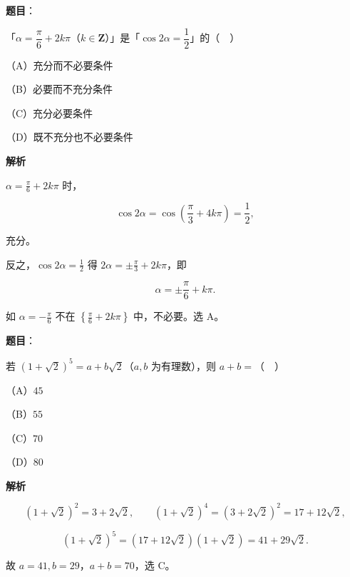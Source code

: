 \begin{answer}

\textbf{题目}：

「$\alpha=\dfrac{\pi}{6}+2k\pi$（$k\in\mathbf Z$）」是「$\cos2\alpha=\dfrac12$」的（　）

（A）充分而不必要条件

（B）必要而不充分条件

（C）充分必要条件

（D）既不充分也不必要条件

\textbf{解析}

$\alpha=\frac\pi6+2k\pi$ 时，

\nopagebreak[4]
\[\cos2\alpha=\cos\left(\frac\pi3+4k\pi\right)=\frac12,\]

充分。

反之，$\cos2\alpha=\frac12$ 得 $2\alpha=\pm\frac\pi3+2k\pi$，即

\nopagebreak[4]
\[\alpha=\pm\frac\pi6+k\pi .\]

如 $\alpha=-\frac\pi6$ 不在 $\left\{\frac\pi6+2k\pi\right\}$ 中，不必要。选 A。


\end{answer}
\begin{answer}

\textbf{题目}：

若 $(1+\sqrt2)^5=a+b\sqrt2$（$a,b$ 为有理数），则 $a+b=$（　）

（A）$45$

（B）$55$

（C）$70$

（D）$80$

\textbf{解析}

\nopagebreak[4]
\[(1+\sqrt2)^2=3+2\sqrt2,\qquad (1+\sqrt2)^4=(3+2\sqrt2)^2=17+12\sqrt2,\]

\nopagebreak[4]
\[(1+\sqrt2)^5=(17+12\sqrt2)(1+\sqrt2)=41+29\sqrt2 .\]

故 $a=41,b=29$，$a+b=70$，选 C。


\end{answer}
